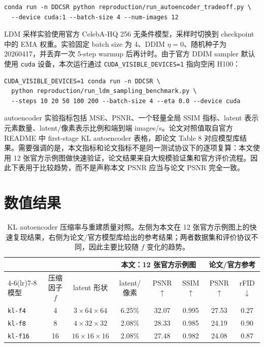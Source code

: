 \documentclass[11pt,a4paper]{article}
\begin{document}
\begin{verbatim}
conda run -n DDCSR python reproduction/run_autoencoder_tradeoff.py \
  --device cuda:1 --batch-size 4 --num-images 12
\end{verbatim}

LDM 采样实验使用官方 CelebA-HQ 256 无条件模型，采样时切换到 checkpoint 中的 EMA 权重。实验固定 batch size 为 4、DDIM $\eta=0$、随机种子为 20260417，并丢弃一次 5-step warmup 后再计时。由于官方 DDIM sampler 默认使用 \texttt{cuda} 设备，本次运行通过 \texttt{CUDA\_VISIBLE\_DEVICES=1} 指向空闲 H100：

\begin{verbatim}
CUDA_VISIBLE_DEVICES=1 conda run -n DDCSR \
  python reproduction/run_ldm_sampling_benchmark.py \
  --steps 10 20 50 100 200 --batch-size 4 --eta 0.0 --device cuda
\end{verbatim}

autoencoder 实验指标包括 MSE、PSNR、一个轻量全局 SSIM 指标、latent 表示元素数量、latent/像素表示比例和端到端 images/s。论文对照值取自官方 README 中 first-stage KL autoencoder 表格，即论文 Table 8 对应模型库结果。需要强调的是，本文指标和论文指标不是同一测试协议下的逐项复算：本文使用 12 张官方示例图做快速验证，论文结果来自大规模验证集和官方评价流程。因此下表用于比较趋势，而不是声称本文 PSNR 应当与论文 PSNR 完全一致。

\section{数值结果}

\begin{table}[htbp]
\centering
\small
\caption{KL autoencoder 压缩率与重建质量对照。左侧为本文在 12 张官方示例图上的快速复现结果，右侧为论文/官方模型库给出的参考结果；两者数据集和评价协议不同，因此主要比较随 $f$ 变化的趋势。}
\begin{tabular}{lccccc cc}
\toprule
 & & & \multicolumn{3}{c}{本文：12 张官方示例图} & \multicolumn{2}{c}{论文/官方参考} \\
\cmidrule(lr){4-6}\cmidrule(lr){7-8}
模型 & 压缩因子 $f$ & latent 形状 & latent/像素 & PSNR$\uparrow$ & SSIM$\uparrow$ & PSNR$\uparrow$ & rFID$\downarrow$ \\
\midrule
\texttt{kl-f4}  & 4  & $3\times64\times64$   & 6.25\% & 32.07 & 0.995 & 27.53 & 0.27 \\
\texttt{kl-f8}  & 8  & $4\times32\times32$   & 2.08\% & 28.33 & 0.985 & 24.19 & 0.90 \\
\texttt{kl-f16} & 16 & $16\times16\times16$  & 2.08\% & 27.48 & 0.982 & 24.08 & 0.87 \\
\bottomrule
\end{tabular}
\end{table}
\end{document}
